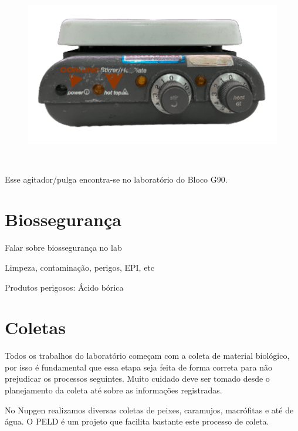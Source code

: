 \documentclass[
  letterpaper,
  DIV=11,
  numbers=noendperiod]{scrreprt}
\begin{document}
\begin{figure}

{\centering \includegraphics[width=\textwidth,height=3.125in]{figures/equipamentos/agitador_magnetico.png}

}

\end{figure}

Esse agitador/pulga encontra-se no laboratório do Bloco G90.


\hypertarget{biosseguranuxe7a}{%
\chapter{Biossegurança}\label{biosseguranuxe7a}}

Falar sobre biossegurança no lab

Limpeza, contaminação, perigos, EPI, etc

Produtos perigosos: Ácido bórica


\hypertarget{coletas}{%
\chapter{Coletas}\label{coletas}}

Todos os trabalhos do laboratório começam com a coleta de material
biológico, por isso é fundamental que essa etapa seja feita de forma
correta para não prejudicar os processos seguintes. Muito cuidado deve
ser tomado desde o planejamento da coleta até sobre as informações
registradas.

No Nupgen realizamos diversas coletas de peixes, caramujos, macrófitas e
até de água. O PELD é um projeto que facilita bastante este processo de
coleta.
\end{document}

